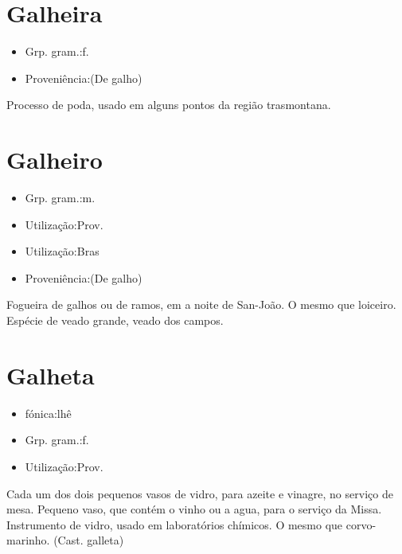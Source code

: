 \section{Galheira}
\begin{itemize}
\item {Grp. gram.:f.}
\end{itemize}
\begin{itemize}
\item {Proveniência:(De \textunderscore galho\textunderscore )}
\end{itemize}
Processo de poda, usado em alguns pontos da região trasmontana.
\section{Galheiro}
\begin{itemize}
\item {Grp. gram.:m.}
\end{itemize}
\begin{itemize}
\item {Utilização:Prov.}
\end{itemize}
\begin{itemize}
\item {Utilização:Bras}
\end{itemize}
\begin{itemize}
\item {Proveniência:(De \textunderscore galho\textunderscore )}
\end{itemize}
Fogueira de galhos ou de ramos, em a noite de San-João.
O mesmo que \textunderscore loiceiro\textunderscore .
Espécie de veado grande, veado dos campos.
\section{Galheta}
\begin{itemize}
\item {fónica:lhê}
\end{itemize}
\begin{itemize}
\item {Grp. gram.:f.}
\end{itemize}
\begin{itemize}
\item {Utilização:Prov.}
\end{itemize}
Cada um dos dois pequenos vasos de vidro, para azeite e vinagre, no serviço de mesa.
Pequeno vaso, que contém o vinho ou a agua, para o serviço da Missa.
Instrumento de vidro, usado em laboratórios chímicos.
O mesmo que \textunderscore corvo-marinho\textunderscore .
(Cast. \textunderscore galleta\textunderscore )
